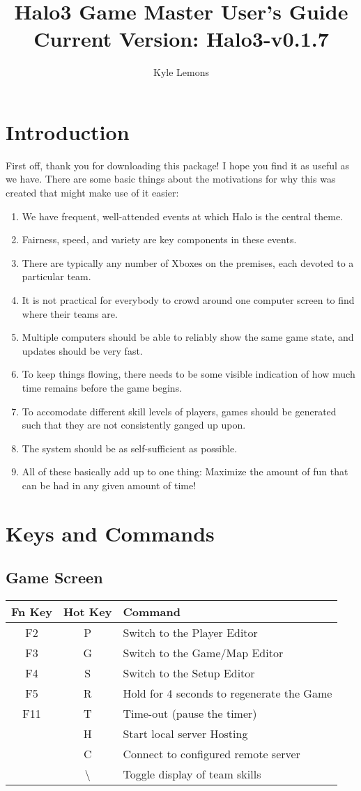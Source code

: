 \documentclass[pdftex,10pt,a4paper]{report}
\author{Kyle Lemons}
\title{Halo3 Game Master User's Guide \\
{\large{Current Version: Halo3-v0.1.7}}}
\begin{document}

\tableofcontents
\pagebreak

\chapter{Introduction}
First off, thank you for downloading this package!  I hope you find it as useful as we have.
There are some basic things about the motivations for why this was created that might make use of it easier:
\begin{enumerate}
\item We have frequent, well-attended events at which Halo is the central theme.
\item Fairness, speed, and variety are key components in these events.
\item There are typically any number of Xboxes on the premises, each devoted to a particular team.
\item It is not practical for everybody to crowd around one computer screen to find where their teams are.
\item Multiple computers should be able to reliably show the same game state, and updates should be very fast.
\item To keep things flowing, there needs to be some visible indication of how much time remains before the game begins.
\item To accomodate different skill levels of players, games should be generated such that they are not consistently ganged up upon.
\item The system should be as self-sufficient as possible.
\item All of these basically add up to one thing: Maximize the amount of fun that can be had in any given amount of time!
\end{enumerate}

\chapter{Keys and Commands}
\section{Game Screen}
\begin{tabular}{c|c|l}
Fn Key & Hot Key & Command \\
\hline
F2 & P & Switch to the Player Editor \\
F3 & G & Switch to the Game/Map Editor \\
F4 & S & Switch to the Setup Editor \\
F5 & R & Hold for 4 seconds to regenerate the Game \\
F11 & T & Time-out (pause the timer) \\
& H & Start local server Hosting \\
& C & Connect to configured remote server \\
& \textbackslash & Toggle display of team skills \\
\end{tabular}
\end{document}

